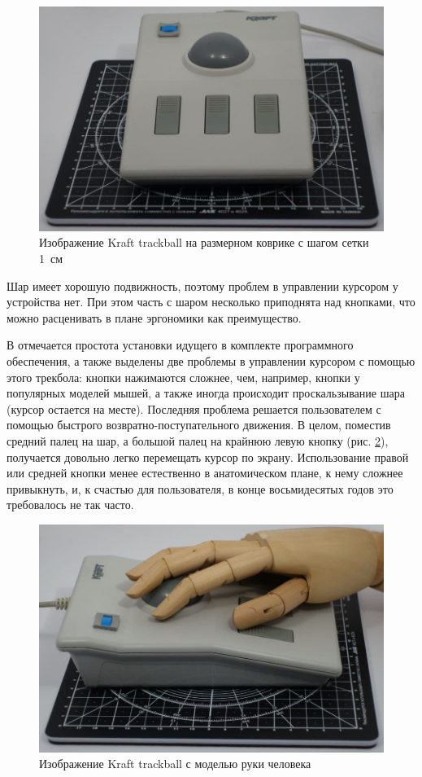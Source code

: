 \documentclass[11pt, a4paper]{article}
\begin{document}
\begin{figure}[h]
    \centering
    \includegraphics[scale=0.25]{1989_kraft_trackball/page3.2.jpg}
    \caption{Изображение Kraft trackball на размерном коврике с шагом сетки 1~см}
    \label{fig:KraftSize}
\end{figure}

Шар имеет хорошую подвижность, поэтому проблем в управлении курсором у устройства нет. При этом часть с шаром несколько приподнята над кнопками, что можно расценивать в плане эргономики как преимущество.

В \cite{Hudnall} отмечается простота установки идущего в комплекте программного обеспечения, а также выделены две проблемы в управлении курсором с помощью этого трекбола: кнопки нажимаются сложнее, чем, например, кнопки у популярных моделей мышей, а также иногда происходит проскальзывание шара (курсор остается на месте). Последняя проблема решается пользователем с помощью быстрого возвратно-поступательного движения. В целом, поместив средний палец на шар, а большой палец на крайнюю левую кнопку (рис. \ref{fig:KraftHand}), получается довольно легко перемещать курсор по экрану. Использование правой или средней кнопки менее естественно в анатомическом плане, к нему сложнее привыкнуть, и, к счастью для пользователя, в конце восьмидесятых годов это требовалось не так часто.

\begin{figure}[h]
    \centering
    \includegraphics[scale=0.25]{1989_kraft_trackball/page3.1.jpg}
    \caption{Изображение Kraft trackball с моделью руки человека}
    \label{fig:KraftHand}
\end{figure}
\end{document}

